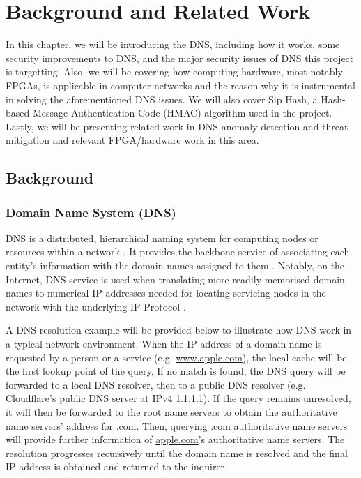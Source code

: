 \documentclass[a4paper]{report}
\begin{document}
\chapter{Background and Related Work}

In this chapter, we will be introducing the DNS, including how it works, some security improvements to DNS, and the major security issues of DNS this project is targetting. Also, we will be covering how computing hardware, most notably FPGAs, is applicable in computer networks and the reason why it is instrumental in solving the aforementioned DNS issues. We will also cover Sip Hash, a Hash-based Message Authentication Code (HMAC) algorithm used in the project. Lastly, we will be presenting related work in DNS anomaly detection and threat mitigation and relevant FPGA/hardware work in this area.

\section{Background}

\subsection{Domain Name System (DNS)}
DNS is a distributed, hierarchical naming system for computing nodes or resources within a network \cite{RFC-1034}. It provides the backbone service of associating each entity's information with the domain names assigned to them \cite{RFC-1034, RFC-1035}. Notably, on the Internet, DNS service is used when translating more readily memorised domain names to numerical IP addresses needed for locating servicing nodes in the network with the underlying IP Protocol \cite{RFC-1034, RFC-791}.

A DNS resolution example will be provided below to illustrate how DNS work in a typical network environment. When the IP address of a domain name is requested by a person or a service (e.g. \url{www.apple.com}), the local cache will be the first lookup point of the query. If no match is found, the DNS query will be forwarded to a local DNS resolver, then to a public DNS resolver (e.g. Cloudflare's public DNS server at IPv4 \url{1.1.1.1}). If the query remains unresolved, it will then be forwarded to the root name servers to obtain the authoritative name servers' address for \url{.com}. Then, querying \url{.com} authoritative name servers will provide further information of \url{apple.com}'s authoritative name servers. The resolution progresses recursively until the domain name is resolved and the final IP address is obtained and returned to the inquirer.
\end{document}
